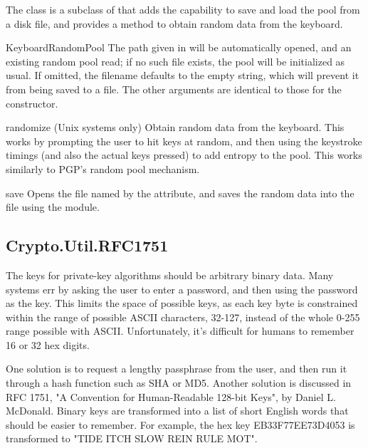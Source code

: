 \documentclass{howto}
\begin{document}
The  class is a subclass of  
that adds the capability to save and load the pool from a disk file, and
provides a method to obtain random data from the keyboard.

\begin{funcdesc}{KeyboardRandomPool}{}
The path given in  will be automatically opened, and an
existing random pool read; if no such file exists, the pool will be
initialized as usual.  If omitted, the filename defaults to the empty
string, which will prevent it from being saved to a file.  The other
arguments are identical to those for the  constructor.
\end{funcdesc}

\begin{funcdesc}{randomize}{}
(Unix systems only)  Obtain random data from the keyboard.  This works
by prompting the
user to hit keys at random, and then using the keystroke timings (and
also the actual keys pressed) to add entropy to the pool.  This works
similarly to PGP's random pool mechanism.
\end{funcdesc}

\begin{funcdesc}{save}{}
Opens the file named by the  attribute, and saves the
random data into the file using the  module.
\end{funcdesc}


\subsection{Crypto.Util.RFC1751}
The keys for private-key algorithms should be arbitrary binary data.
Many systems err by asking the user to enter a password, and then using
the password as the key.  This limits the space of possible keys, as
each key byte is constrained within the range of possible ASCII
characters, 32-127, instead of the whole 0-255 range possible with ASCII.
Unfortunately, it's difficult for humans to remember 16 or 32 hex
digits.  

One solution is to request a lengthy passphrase from the user, and then
run it through a hash function such as SHA or MD5.  Another solution is
discussed in RFC 1751, "A Convention for Human-Readable 128-bit Keys",
by Daniel L. McDonald.  Binary keys are transformed into a list of short
English words that should be easier to remember.  For example, the hex
key EB33F77EE73D4053 is transformed to "TIDE ITCH SLOW REIN RULE MOT".
\end{document}

